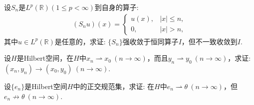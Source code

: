 \documentclass[../../main.tex]{subfiles}%
\begin{document}
\begin{example}
设$S_n$是$L^p(\mathbb{R})(1\leqslant p<\infty)$到自身的算子:
\begin{align*}
(S_nu)(x)=
\begin{cases}
u(x),&|x|\leqslant n,\\
0,&|x|>n,
\end{cases}
\end{align*}
其中$u\in L^p(\mathbb{R})$是任意的，求证: $\{S_n\}$强收敛于恒同算子$I$，但不一致收敛到$I$.
\end{example}

\begin{example}
设$H$是Hilbert空间，在$H$中$x_n\rightharpoonup x_0\ (n\to\infty)$，而且$y_n\rightharpoonup y_0\ (n\to\infty)$，求证: $(x_n,y_n)\to(x_0,y_0)\ (n\to\infty)$.
\end{example}

\begin{example}
设$\{e_n\}$是Hilbert空间$H$中的正交规范集，求证: 在$H$中$e_n\rightharpoonup \theta\ (n\to\infty)$，但$e_n\nrightarrow \theta\ (n\to\infty)$.
\end{example}
\end{document}
